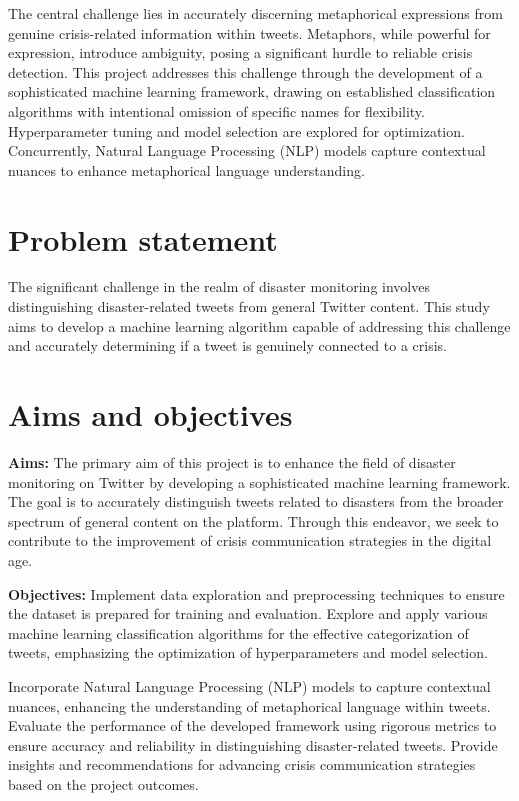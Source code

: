 The central challenge lies in accurately discerning metaphorical expressions from genuine crisis-related information within tweets. Metaphors, while powerful for expression, introduce ambiguity, posing a significant hurdle to reliable crisis detection. This project addresses this challenge through the development of a sophisticated machine learning framework, drawing on established classification algorithms with intentional omission of specific names for flexibility. Hyperparameter tuning and model selection are explored for optimization. Concurrently, Natural Language Processing (NLP) models capture contextual nuances to enhance metaphorical language understanding.


\section{Problem statement}
\label{sec:intro_prob_art}

The significant challenge in the realm of disaster monitoring involves distinguishing disaster-related tweets from general Twitter content. This study aims to develop a machine learning algorithm capable of addressing this challenge and accurately determining if a tweet is genuinely connected to a crisis.

\section{Aims and objectives}
\label{sec:intro_aims_obj} 

 
  \textbf{Aims:}
The primary aim of this project is to enhance the field of disaster monitoring on Twitter by developing a sophisticated machine learning framework. The goal is to accurately distinguish tweets related to disasters from the broader spectrum of general content on the platform. Through this endeavor, we seek to contribute to the improvement of crisis communication strategies in the digital age.

\textbf{Objectives:} Implement data exploration and preprocessing techniques to ensure the dataset is prepared for training and evaluation.
Explore and apply various machine learning classification algorithms for the effective categorization of tweets, emphasizing the optimization of hyperparameters and model selection.

Incorporate Natural Language Processing (NLP) models to capture contextual nuances, enhancing the understanding of metaphorical language within tweets.
Evaluate the performance of the developed framework using rigorous metrics to ensure accuracy and reliability in distinguishing disaster-related tweets.
Provide insights and recommendations for advancing crisis communication strategies based on the project outcomes.


